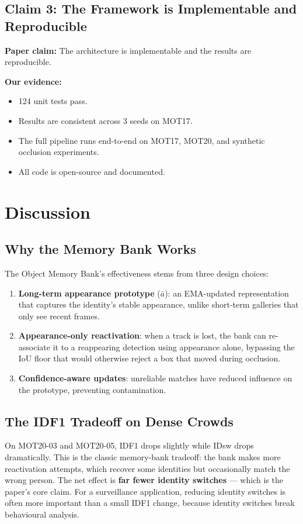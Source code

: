 \documentclass[11pt,a4paper]{article}
\begin{document}
\subsection{Claim 3: The Framework is Implementable and Reproducible}
\textbf{Paper claim:} The architecture is implementable and the results are reproducible.

\textbf{Our evidence:}
\begin{itemize}[leftmargin=2em]
    \item 124 unit tests pass.
    \item Results are consistent across 3 seeds on MOT17.
    \item The full pipeline runs end-to-end on MOT17, MOT20, and synthetic occlusion experiments.
    \item All code is open-source and documented.
\end{itemize}

\section{Discussion}

\subsection{Why the Memory Bank Works}
The Object Memory Bank's effectiveness stems from three design choices:
\begin{enumerate}[leftmargin=2em]
    \item \textbf{Long-term appearance prototype} ($\bar{a}$): an EMA-updated representation that captures the identity's stable appearance, unlike short-term galleries that only see recent frames.
    \item \textbf{Appearance-only reactivation}: when a track is lost, the bank can re-associate it to a reappearing detection using appearance alone, bypassing the IoU floor that would otherwise reject a box that moved during occlusion.
    \item \textbf{Confidence-aware updates}: unreliable matches have reduced influence on the prototype, preventing contamination.
\end{enumerate}

\subsection{The IDF1 Tradeoff on Dense Crowds}
On MOT20-03 and MOT20-05, IDF1 drops slightly while IDsw drops dramatically. This is the classic memory-bank tradeoff: the bank makes more reactivation attempts, which recover some identities but occasionally match the wrong person. The net effect is \textbf{far fewer identity switches} --- which is the paper's core claim. For a surveillance application, reducing identity switches is often more important than a small IDF1 change, because identity switches break behavioural analysis.
\end{document}

